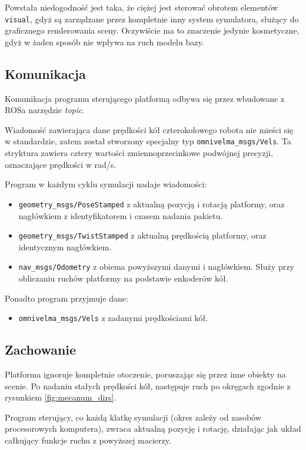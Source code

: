 		Powstała niedogodność jest taka, że ciężej jest sterować obrotem elementów \texttt{visual}, gdyż są zarządzane przez kompletnie inny system symulatora,
		służący do graficznego renderowania sceny.
		Oczywiście ma to znaczenie jedynie kosmetyczne, gdyż w żaden sposób nie wpływa na ruch modelu bazy.

	\subsection{Komunikacja}
		Komunikacja programu sterującego platformą odbywa się przez wbudowane z ROSa narzędzie \emph{topic}.

		Wiadomość zawierająca dane prędkości kół czterokołowego robota nie mieści się w standardzie, zatem został stworzony specjalny typ \texttt{omnivelma\_msgs/Vels}.
		Ta stryktura zawiera cztery wartości zmiennoprzecinkowe podwójnej precyzji, oznaczające prędkości w rad/s.

		Program w każdym cyklu symulacji nadaje wiadomości:
		\begin{itemize}
		\item \texttt{geometry\_msgs/PoseStamped} z aktualną pozycją i rotacją platformy, oraz nagłówkiem z identyfikatorem i czasem nadania pakietu.
		\item \texttt{geometry\_msgs/TwistStamped} z aktualną prędkością platformy, oraz identycznym nagłówkiem.
		\item \texttt{nav\_msgs/Odometry} z obiema powyższymi danymi i nagłówkiem. Służy przy obliczaniu ruchów platformy na podstawie enkoderów kół.
		\end{itemize}
		Ponadto program przyjmuje dane:
		\begin{itemize}
		\item \texttt{omnivelma\_msgs/Vels} z zadanymi prędkościami kół.
		\end{itemize}

	\subsection{Zachowanie}
		Platforma ignoruje kompletnie otoczenie, poruszając się przez inne obiekty na scenie.
		Po nadaniu stałych prędkości kół, następuje ruch po okręgach zgodnie z rysunkiem \ref{fig:mecanum_dirs}.

		Program sterujący, co każdą klatkę symulacji (okres zależy od zasobów procesorowych komputera), zwraca aktualną pozycję i rotację, 
		działając jak układ całkujący funkcje ruchu z powyższej macierzy.

